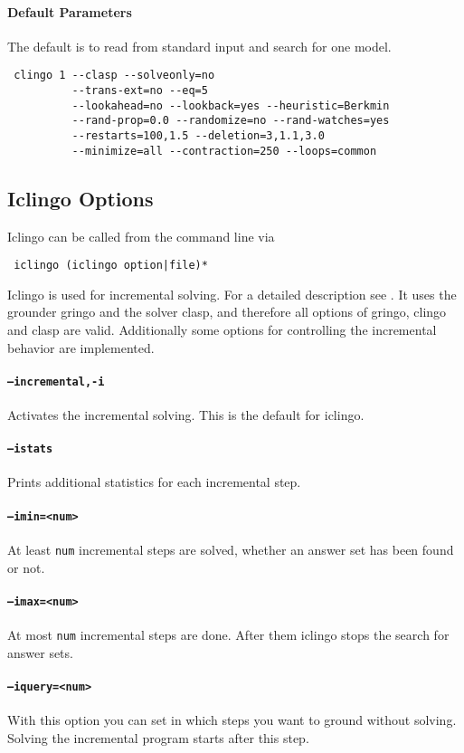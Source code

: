 \documentclass[a4paper,10pt]{article}
\begin{document}
\paragraph{Default Parameters}
The default is to read from standard input and search for one model.
\begin{verbatim}
 clingo 1 --clasp --solveonly=no
          --trans-ext=no --eq=5 
          --lookahead=no --lookback=yes --heuristic=Berkmin
          --rand-prop=0.0 --randomize=no --rand-watches=yes
          --restarts=100,1.5 --deletion=3,1.1,3.0
          --minimize=all --contraction=250 --loops=common
\end{verbatim}

\subsection{Iclingo Options}
Iclingo can be called from the command line via
\begin{verbatim}
 iclingo (iclingo option|file)*
\end{verbatim}
Iclingo is used for incremental solving. For a detailed description see \cite{gekaosscth08a}.
It uses the grounder gringo and the solver clasp, and therefore all options of gringo, clingo and clasp are valid.
Additionally some options for controlling the incremental behavior are implemented.
\paragraph{\texttt{--incremental,-i}}
Activates the incremental solving. This is the default for iclingo.
\paragraph{\texttt{--istats}}
Prints additional statistics for each incremental step.
\paragraph{\texttt{--imin=<num>}}
At least \texttt{num} incremental steps are solved, whether an answer set has been found or not.
\paragraph{\texttt{--imax=<num>}}
At most \texttt{num} incremental steps are done. After them iclingo stops the search for answer sets.
\paragraph{\texttt{--iquery=<num>}}
With this option you can set in which steps you want to ground without solving.
Solving the incremental program starts after this step.
\end{document}
